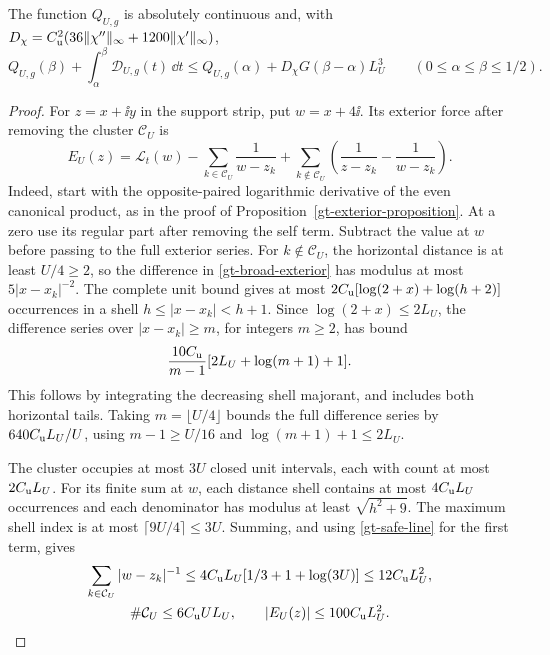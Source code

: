 \begin{proposition}
\label{gt-convex-balance}
The function \(Q_{U,g}\) is absolutely continuous and, with
\(D_\chi=C_{\rm u}^2(36\|\chi''\|_\infty+1200\|\chi'\|_\infty)\),
\begin{equation}
 Q_{U,g}(\beta)+\int_\alpha^\beta\mathcal D_{U,g}(t)\,\dd t
 \le Q_{U,g}(\alpha)+D_\chi G(\beta-\alpha)L_U^3
 \qquad(0\le\alpha\le\beta\le1/2).
 \label{gt-convex-integrated}
\end{equation}
\end{proposition}

\begin{proof}
For \(z=x+\ii y\) in the support strip, put \(w=x+4\ii\). Its
exterior force after removing the cluster \(\mathcal C_U\) is
\begin{equation}
 E_U(z)=\mathcal L_t(w)-\sum_{k\in\mathcal C_U}\frac1{w-z_k}
     +\sum_{k\notin\mathcal C_U}
        \left(\frac1{z-z_k}-\frac1{w-z_k}\right).
 \label{gt-broad-exterior}
\end{equation}
Indeed, start with the opposite-paired logarithmic derivative of
the even canonical product, as in the proof of
Proposition~\ref{gt-exterior-proposition}. At a zero use its regular
part after removing the self term. Subtract the value at \(w\) before
passing to the full exterior series. For \(k\notin\mathcal C_U\), the
horizontal distance is at least \(U/4\ge2\), so the difference in
\eqref{gt-broad-exterior} has modulus at most \(5|x-x_k|^{-2}\).
The complete unit bound gives at most
\(2C_{\rm u}[\log(2+x)+\log(h+2)]\) occurrences in a shell
\(h\le|x-x_k|<h+1\). Since \(\log(2+x)\le2L_U\), the difference
series over \(|x-x_k|\ge m\), for integers \(m\ge2\), has bound
\[
 \frac{10C_{\rm u}}{m-1}[2L_U+\log(m+1)+1].
\]
This follows by integrating the decreasing shell majorant, and
includes both horizontal tails. Taking \(m=\lfloor U/4\rfloor\)
bounds the full difference series by \(640C_{\rm u}L_U/U\),
using \(m-1\ge U/16\) and \(\log(m+1)+1\le2L_U\).

The cluster occupies at most \(3U\) closed unit intervals, each with
count at most \(2C_{\rm u}L_U\). For its finite sum at \(w\), each
distance shell contains at most \(4C_{\rm u}L_U\) occurrences
and each denominator has modulus at least \(\sqrt{h^2+9}\).
The maximum shell index is at most \(\lceil9U/4\rceil\le3U\).
Summing, and using \eqref{gt-safe-line} for the first term, gives
\[
 \begin{gathered}
 \sum_{k\in\mathcal C_U}|w-z_k|^{-1}
 \le4C_{\rm u}L_U[1/3+1+\log(3U)]\le12C_{\rm u}L_U^2,\\
 \#\mathcal C_U\le6C_{\rm u}UL_U,\qquad |E_U(z)|\le100C_{\rm u}L_U^2 .
 \end{gathered}
\]


\end{proof}
